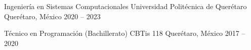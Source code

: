 
\education
{Ingeniería en Sistemas Computacionales}
{Universidad Politécnica de Querétaro}
{Querétaro, México}
{2020 -- 2023}

\education
{Técnico en Programación (Bachillerato)}
{CBTis 118}
{Querétaro, México}
{2017 -- 2020}
